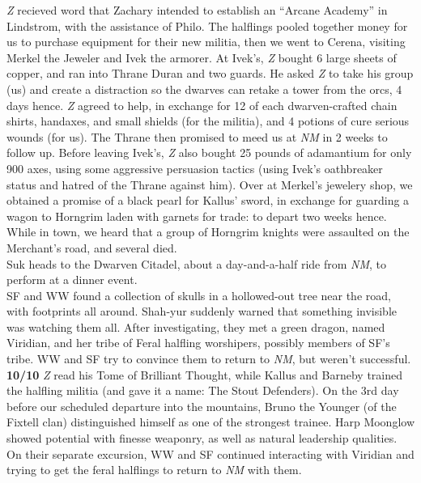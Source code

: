 \documentclass[letterpaper]{article}
\begin{document}
\noindent \emph{Z} recieved word that Zachary intended to establish an ``Arcane Academy'' in Lindstrom, with the assistance of Philo.  The halflings pooled together money for us to purchase equipment for their new militia, then we went to Cerena, visiting Merkel the Jeweler and Ivek the armorer.  At Ivek's, \emph{Z} bought 6 large sheets of copper, and ran into Thrane Duran and two guards.  He asked \emph{Z} to take his group (us) and create a distraction so the dwarves can retake a tower from the orcs, 4 days hence. \emph{Z} agreed to help, in exchange for 12 of each dwarven-crafted chain shirts, handaxes, and small shields (for the militia), and 4 potions of cure serious wounds (for us).  The Thrane then promised to meed us at \emph{NM} in 2 weeks to follow up.  Before leaving Ivek's, \emph{Z} also bought 25 pounds of adamantium for only 900 axes, using some aggressive persuasion tactics (using Ivek's oathbreaker status and hatred of the Thrane against him).  Over at Merkel's jewelery shop, we obtained a promise of a black pearl for Kallus' sword, in exchange for guarding a wagon to Horngrim laden with garnets for trade: to depart two weeks hence. While in town, we heard that a group of Horngrim knights were assaulted on the Merchant's road, and several died. \\

\noindent Suk heads to the Dwarven Citadel, about a day-and-a-half ride from \emph{NM}, to perform at a dinner event. \\

\noindent SF and WW found a collection of skulls in a hollowed-out tree near the road, with footprints all around.  Shah-yur suddenly warned that something invisible was watching them all.  After investigating, they met a green dragon, named Viridian, and her tribe of Feral halfling worshipers, possibly members of SF's tribe.  WW and SF try to convince them to return to \emph{NM}, but weren't successful. \\

\noindent \textbf{10/10} \emph{Z} read his Tome of Brilliant Thought, while Kallus and Barneby trained the halfling militia (and gave it a name: The Stout Defenders). On the 3rd day before our scheduled departure into the mountains, Bruno the Younger (of the Fixtell clan) distinguished himself as one of the strongest trainee.  Harp Moonglow showed potential with finesse weaponry, as well as natural leadership qualities.  \\

\noindent On their separate excursion, WW and SF continued interacting with Viridian and trying to get the feral halflings to return to \emph{NM} with them.  \\
\end{document}
